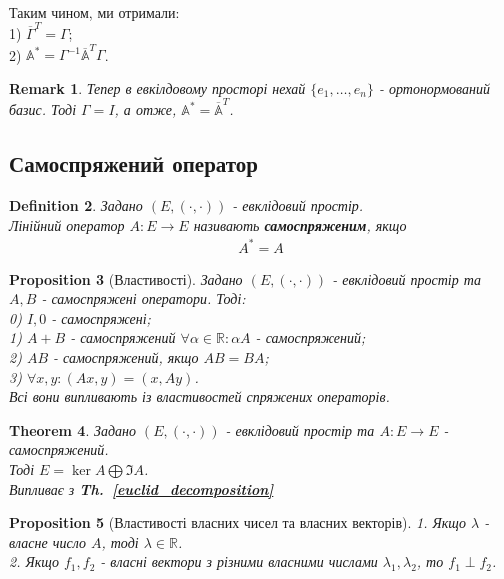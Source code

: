 \documentclass[a4paper, 10pt]{article}
\theoremstyle{theoremdd}
\newtheorem{theorem}{Theorem}[subsection]
\newtheorem{definition}[theorem]{Definition}
\newtheorem{proposition}[theorem]{Proposition}
\newtheorem{remark}[theorem]{Remark}
\newcommand\thref[1]{\textbf{Th.~\ref{#1}}}
\begin{document}
\bigskip \\
Таким чином, ми отримали:\\
1) $\overline{\Gamma}^T = \Gamma$;\\
2) $\mathbb{A^*} = \Gamma^{-1} \mathbb{\overline{A}}^T \Gamma$.

\begin{remark}
Тепер в евкілдовому просторі нехай $\{e_1,\dots,e_n\}$ - ортонормований базис. Тоді $\Gamma = I$, а отже, $\mathbb{A^*} = \mathbb{\overline{A}}^T$.
\end{remark}

\subsection{Самоспряжений оператор}
\begin{definition}
Задано $(E,(\cdot,\cdot))$ - евклідовий простір.\\
Лінійний оператор $A: E \to E$ називають \textbf{самоспряженим}, якщо
\begin{align*}
A^* = A
\end{align*}
\end{definition}

\begin{proposition}[Властивості]
Задано $(E,(\cdot,\cdot))$ - евклідовий простір та $A,B$ - самоспряжені оператори. Тоді:\\
0) $I,0$ - самоспряжені;\\
1) $A+B$ - самоспряжений \hspace{1cm} $\forall \alpha \in \mathbb{R}: \alpha A$ - самоспряжений;\\
2) $AB$ - самоспряжений, якщо $AB = BA$;\\
3) $\forall x,y: (Ax,y) = (x,Ay)$.\\
\textit{Всі вони випливають із властивостей спряжених операторів.}
\end{proposition}

\begin{theorem}
\label{euclid_decomposition_2}
Задано $(E,(\cdot,\cdot))$ - евклідовий простір та $A: E \to E$ - самоспряжений.\\
Тоді $E = \ker A \bigoplus \Im A$.\\
\textit{Випливає з } \thref{euclid_decomposition}
\end{theorem}

\begin{proposition}[Властивості власних чисел та власних векторів]
1. Якщо $\lambda$ - власне число $A$, тоді $\lambda \in \mathbb{R}$.\\
2. Якщо $f_1,f_2$ - власні вектори з різними власними числами $\lambda_1, \lambda_2$, то $f_1 \perp f_2$.
\end{proposition}
\end{document}
